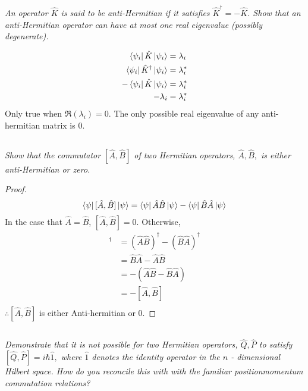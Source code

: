 \documentclass[12pt, letterpaper]{article}
\begin{document}
\subsection{}
\textit{An operator $\hat{K}$ is said to be anti-Hermitian if it satisfies $\hat{K}^{\dagger}=-\hat{K}$. Show that an anti-Hermitian operator can have at most one real eigenvalue (possibly degenerate).}

\begin{align*}
    \bra{\psi_i} \hat K \ket{\psi_i} &= \lambda_i \\
    \bra{\psi_i} \hat{K}^\dagger \ket{\psi_i} &= \lambda_i^* \\
    -\bra{\psi_i} \hat{K} \ket{\psi_i} &= \lambda_i^* \\
    -\lambda_i &= \lambda_i^* \\
\end{align*}
Only true when $\Re\left(\lambda_i\right)= 0$. The only possible real eigenvalue of any anti-hermitian matrix is 0. 

\subsection{}
\textit{Show that the commutator $[\hat{A}, \hat{B}]$ of two Hermitian operators, $\hat{A}, \hat{B},$ is either anti-Hermitian or zero.}
\begin{proof}
$$
\bra \psi [\hat{A}, \hat{B}] \ket \psi = \bra \psi \hat{A}\hat{B} \ket \psi -\bra \psi \hat{B}\hat{A} \ket \psi 
$$
In the case that $\hat{A}= \hat{B}$, $[\hat{A}, \hat{B}] = 0$. Otherwise, 
\begin{align*}
    [\hat{A}, \hat{B}]^\dagger &= \left(\hat A \hat B \right)^\dagger - \left(\hat B \hat A \right)^\dagger \\
    &=\hat B \hat A -\hat A \hat B\\
    &=-\left(\hat A \hat B-\hat B \hat A  \right)\\
    &= - [\hat{A}, \hat{B}]\\
\end{align*}
$\therefore [\hat{A}, \hat{B}]$ is either Anti-hermitian or 0.  
\end{proof}

\subsection{}
\textit{Demonstrate that it is not possible for two Hermitian operators, $\hat{Q}, \hat{P}$ to satisfy $[\hat{Q}, \hat{P}]=i \hbar \hat{1},$ where $\hat{1}$ denotes the identity operator in the $n$ - dimensional Hilbert space. How do you reconcile this with with the familiar positionmomentum commutation relations?}
\end{document}
